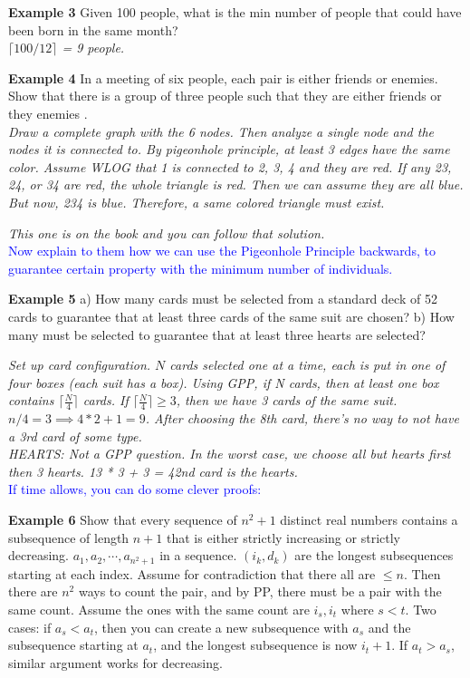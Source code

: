 \documentclass{article}
\begin{document}
{\bf Example 3} Given 100 people, what is the min number of people that could have been born in the same month?  \\
{\it $\lceil 100/12 \rceil$ = 9 people.}


{\bf Example 4} In a meeting of six people, each pair is either friends or enemies. Show that there is a group of three people such that they are either friends or they enemies .  \\
{ \it Draw a complete graph with the 6 nodes. Then analyze a single node and the nodes it is connected to. By pigeonhole principle, at least 3 edges have the same color. Assume WLOG that 1 is connected to 2, 3, 4 and they are red. If any 23, 24, or 34 are red, the whole triangle is red. Then we can assume they are all blue. But now, 234 is blue. Therefore, a same colored triangle must exist.}




{\it This one is on the book and you can follow that solution.}\\

\textcolor{blue}{Now explain to them how we can use the Pigeonhole Principle backwards, to guarantee certain property with the minimum number of individuals.}

{\bf Example 5} a) How many cards must be selected from a standard deck of 52 cards to guarantee that at least three cards of the same suit are chosen?
b) How many must be selected to guarantee that at least three hearts are selected?

{\it Set up card configuration. $N$ cards selected one at a time, each is put in one of four boxes (each suit has a box). Using GPP, if N cards, then at least one box contains $\lceil \frac{N}{4} \rceil$ cards. If $\lceil \frac{N}{4} \rceil \geq 3$, then we have 3 cards of the same suit. $n/4 = 3 \implies 4*2 + 1 = 9$. After choosing the 8th card, there's no way to not have a 3rd card of some type.}\\


{\it HEARTS: Not a GPP question. In the worst case, we choose all but hearts first then 3 hearts. 13 * 3 + 3 = 42nd card is the hearts.}\\

\textcolor{blue}{If time allows, you can do some clever proofs:}

{\bf Example 6} Show that every sequence of $n^2+1$ distinct real numbers contains a subsequence of length $n + 1$ that is either strictly increasing or strictly decreasing.
$a_1, a_2, \cdots, a_{n^2+1}$ in a sequence. $(i_k, d_k)$ are the longest subsequences starting at each index. Assume for contradiction that there all are $\leq n$. Then there are $n^2$ ways to count the pair, and by PP, there must be a pair with the same count. Assume the ones with the same count are $i_s, i_t$ where $s < t$. Two cases: if $a_s < a_t$, then you can create a new subsequence with $a_s$ and the subsequence starting at $a_t$, and the longest subsequence is now $i_t + 1$. If $a_t > a_s$, similar argument works for decreasing.
\end{document}
